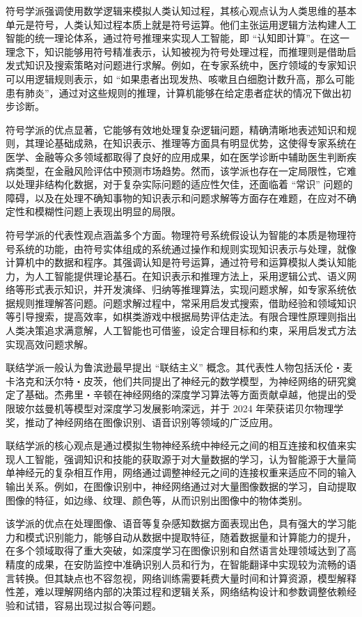 符号学派强调使用数学逻辑来模拟人类认知过程，其核心观点认为人类思维的基本单元是符号，人类认知过程本质上就是符号运算。他们主张运用逻辑方法构建人工智能的统一理论体系，通过符号推理来实现人工智能，即 “认知即计算”。在这一理念下，知识能够用符号精准表示，认知被视为符号处理过程，而推理则是借助启发式知识及搜索策略对问题进行求解。例如，在专家系统中，医疗领域的专家知识可以用逻辑规则表示，如 “如果患者出现发热、咳嗽且白细胞计数升高，那么可能患有肺炎”，通过对这些规则的推理，计算机能够在给定患者症状的情况下做出初步诊断。


符号学派的优点显著，它能够有效地处理复杂逻辑问题，精确清晰地表述知识和规则，其理论基础成熟，在知识表示、推理等方面具有明显优势，这使得专家系统在医学、金融等众多领域都取得了良好的应用成果，如在医学诊断中辅助医生判断疾病类型，在金融风险评估中预测市场趋势。然而，该学派也存在一定局限性，它难以处理非结构化数据，对于复杂实际问题的适应性欠佳，还面临着 “常识” 问题的障碍，以及在处理不确知事物的知识表示和问题求解等方面存在难题，在应对不确定性和模糊性问题上表现出明显的局限。


符号学派的代表性观点涵盖多个方面。物理符号系统假设认为智能的本质是物理符号系统的功能，由符号实体组成的系统通过操作和规则实现知识表示与处理，就像计算机中的数据和程序。其强调认知是符号运算，通过符号和运算模拟人类认知能力，为人工智能提供理论基石。在知识表示和推理方法上，采用逻辑公式、语义网络等形式表示知识，并开发演绎、归纳等推理算法，实现问题求解，如专家系统依据规则推理解答问题。问题求解过程中，常采用启发式搜索，借助经验和领域知识等引导搜索，提高效率，如棋类游戏中根据局势评估走法。有限合理性原理则指出人类决策追求满意解，人工智能也可借鉴，设定合理目标和约束，采用启发式方法实现高效问题求解。





联结学派一般认为鲁滨逊最早提出 “联结主义” 概念。其代表性人物包括沃伦・麦卡洛克和沃尔特・皮茨，他们共同提出了神经元的数学模型，为神经网络的研究奠定了基础。杰弗里・辛顿在神经网络的深度学习算法等方面贡献卓越，他提出的受限玻尔兹曼机等模型对深度学习发展影响深远，并于 2024 年荣获诺贝尔物理学奖，推动了神经网络在图像识别、语音识别等领域的广泛应用。


联结学派的核心观点是通过模拟生物神经系统中神经元之间的相互连接和权值来实现人工智能，强调知识和技能的获取源于对大量数据的学习，认为智能源于大量简单神经元的复杂相互作用，网络通过调整神经元之间的连接权重来适应不同的输入输出关系。例如，在图像识别中，神经网络通过对大量图像数据的学习，自动提取图像的特征，如边缘、纹理、颜色等，从而识别出图像中的物体类别。


该学派的优点在处理图像、语音等复杂感知数据方面表现出色，具有强大的学习能力和模式识别能力，能够自动从数据中提取特征，随着数据量和计算能力的提升，在多个领域取得了重大突破，如深度学习在图像识别和自然语言处理领域达到了高精度的成果，在安防监控中准确识别人员和行为，在智能翻译中实现较为流畅的语言转换。但其缺点也不容忽视，网络训练需要耗费大量时间和计算资源，模型解释性差，难以理解网络内部的决策过程和逻辑关系，网络结构设计和参数调整依赖经验和试错，容易出现过拟合等问题。


